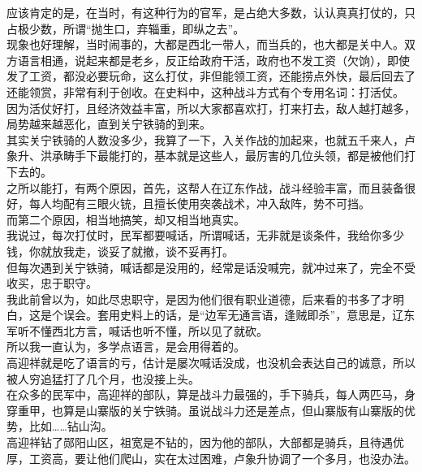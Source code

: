 \begin{multicols}{\theparacolNo}
应该肯定的是，在当时，有这种行为的官军，是占绝大多数，认认真真打仗的，只占极少数，所谓“抛生口，弃辎重，即纵之去”。\\

现象也好理解，当时闹事的，大都是西北一带人，而当兵的，也大都是关中人。双方语言相通，说起来都是老乡，反正给政府干活，政府也不发工资（欠饷），即使发了工资，都没必要玩命，这么打仗，非但能领工资，还能捞点外快，最后回去了还能领赏，非常有利于创收。在史料中，这种战斗方式有个专用名词：打活仗。\\

因为活仗好打，且经济效益丰富，所以大家都喜欢打，打来打去，敌人越打越多，局势越来越恶化，直到关宁铁骑的到来。\\

其实关宁铁骑的人数没多少，我算了一下，入关作战的加起来，也就五千来人，卢象升、洪承畴手下最能打的，基本就是这些人，最厉害的几位头领，都是被他们打下去的。\\

之所以能打，有两个原因，首先，这帮人在辽东作战，战斗经验丰富，而且装备很好，每人均配有三眼火铳，且擅长使用突袭战术，冲入敌阵，势不可挡。\\

而第二个原因，相当地搞笑，却又相当地真实。\\

我说过，每次打仗时，民军都要喊话，所谓喊话，无非就是谈条件，我给你多少钱，你就放我走，谈妥了就撤，谈不妥再打。\\

但每次遇到关宁铁骑，喊话都是没用的，经常是话没喊完，就冲过来了，完全不受收买，忠于职守。\\

我此前曾以为，如此尽忠职守，是因为他们很有职业道德，后来看的书多了才明白，这是个误会。套用史料上的话，是“边军无通言语，逢贼即杀”，意思是，辽东军听不懂西北方言，喊话也听不懂，所以见了就砍。\\

所以我一直认为，多学点语言，是会用得着的。\\

高迎祥就是吃了语言的亏，估计是屡次喊话没成，也没机会表达自己的诚意，所以被人穷追猛打了几个月，也没接上头。\\

在众多的民军中，高迎祥的部队，算是战斗力最强的，手下骑兵，每人两匹马，身穿重甲，也算是山寨版的关宁铁骑。虽说战斗力还是差点，但山寨版有山寨版的优势，比如……钻山沟。\\

高迎祥钻了郧阳山区，祖宽是不钻的，因为他的部队，大部都是骑兵，且待遇优厚，工资高，要让他们爬山，实在太过困难，卢象升协调了一个多月，也没办法。\\


\end{multicols}
